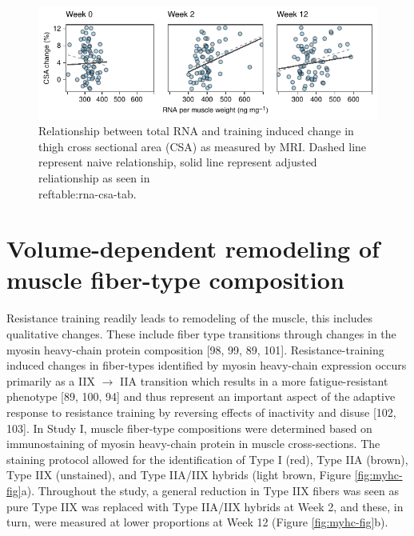 \documentclass[twoside,10pt]{gihclass} %
\begin{document}
\begin{figure}

{\centering \includegraphics{thesis_files/figure-latex/rrna-csa-fig-1} 

}

\caption[Relationship between total RNA and training induced muscle growth]{Relationship between total RNA and training induced change in thigh cross sectional area (CSA) as measured by MRI. Dashed line represent naive relationship, solid line represent adjusted reliationship as seen in \\ref{table:rna-csa-tab}.}\label{fig:rrna-csa-fig}
\end{figure}
\hypertarget{volume-dependent-remodeling-of-muscle-fiber-type-composition}{%
\section{Volume-dependent remodeling of muscle fiber-type composition}\label{volume-dependent-remodeling-of-muscle-fiber-type-composition}}

Resistance training readily leads to remodeling of the muscle, this includes qualitative changes. These include fiber type transitions through changes in the myosin heavy-chain protein composition
{[}98, 99, 89, 101{]}.
Resistance-training induced changes in fiber-types identified by myosin heavy-chain expression occurs primarily as a IIX \(\rightarrow\) IIA transition which results in a more fatigue-resistant phenotype
{[}89, 100, 94{]}
and thus represent an important aspect of the adaptive response to resistance training by reversing effects of inactivity and disuse
{[}102, 103{]}.
In Study I, muscle fiber-type compositions were determined based on immunostaining of myosin heavy-chain protein in muscle cross-sections. The staining protocol allowed for the identification of Type I (red), Type IIA (brown), Type IIX (unstained), and Type IIA/IIX hybrids (light brown, Figure \ref{fig:myhc-fig}a). Throughout the study, a general reduction in Type IIX fibers was seen as pure Type IIX was replaced with Type IIA/IIX hybrids at Week 2, and these, in turn, were measured at lower proportions at Week 12 (Figure \ref{fig:myhc-fig}b).
\end{document}
